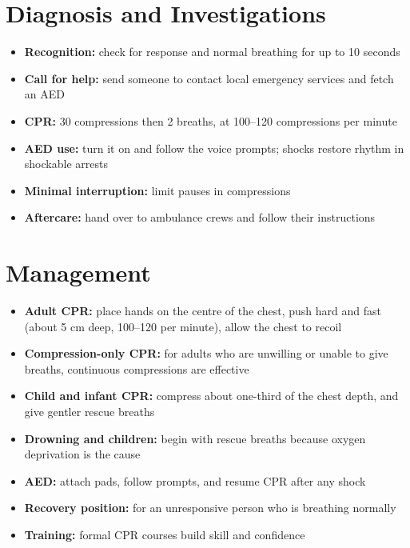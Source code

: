 \section*{Diagnosis and Investigations}
\begin{itemize}
    \item \textbf{Recognition:} check for response and normal breathing for up to 10 seconds
    \item \textbf{Call for help:} send someone to contact local emergency services and fetch an AED
    \item \textbf{CPR:} 30 compressions then 2 breaths, at 100--120 compressions per minute
    \item \textbf{AED use:} turn it on and follow the voice prompts; shocks restore rhythm in shockable arrests
    \item \textbf{Minimal interruption:} limit pauses in compressions
    \item \textbf{Aftercare:} hand over to ambulance crews and follow their instructions
\end{itemize}

\section*{Management}
\begin{itemize}
    \item \textbf{Adult CPR:} place hands on the centre of the chest, push hard and fast (about 5 cm deep, 100--120 per minute), allow the chest to recoil
    \item \textbf{Compression-only CPR:} for adults who are unwilling or unable to give breaths, continuous compressions are effective
    \item \textbf{Child and infant CPR:} compress about one-third of the chest depth, and give gentler rescue breaths
    \item \textbf{Drowning and children:} begin with rescue breaths because oxygen deprivation is the cause
    \item \textbf{AED:} attach pads, follow prompts, and resume CPR after any shock
    \item \textbf{Recovery position:} for an unresponsive person who is breathing normally
    \item \textbf{Training:} formal CPR courses build skill and confidence
\end{itemize}

